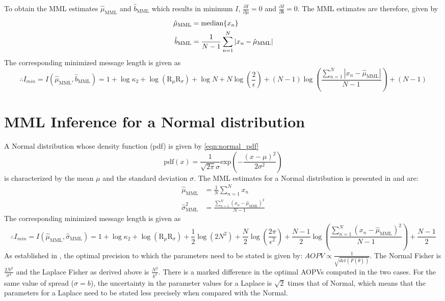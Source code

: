 \documentclass[wcp]{jmlr}
\begin{document}
\noindent To obtain the MML estimates $\hat{\mu}_{\mathrm{MML}}$ and $\hat{b}_{\mathrm{MML}}$ 
which results in minimum $I$, $\frac{\partial I}{\partial \mu} = 0$ and 
$\frac{\partial I}{\partial b} = 0$. The MML estimates are therefore, given by
\begin{align}
  \hat{\mu}_{\mathrm{MML}} &= \mathrm{median}\{x_n\} \notag\\
  \hat{b}_{\mathrm{MML}} &= \frac{1}{N-1} \sum_{n=1}^N |x_n-\hat{\mu}_{\mathrm{MML}}| 
  \label{eqn:laplace_estimate}
\end{align}
The corresponding minimized message length is given as
\begin{dmath}
 \therefore I_{min} = I(\hat{\mu}_{\mathrm{MML}},\hat{b}_{\mathrm{MML}}) = 1 + \log\kappa_2 + \log(\mathrm{R}_{\mu}\mathrm{R}_{\sigma}) + \log N + N\log\left(\frac{2}{\epsilon}\right) + (N-1) \log \left( \frac{\sum_{n=1}^N |x_n-\hat{\mu}_{\mathrm{MML}}|}{N-1} \right) + (N-1) \label{eqn:laplace_mml_estimate}
\end{dmath} 

\section{MML Inference for a Normal distribution}
A Normal distribution whose density function (pdf) is given by \eqref{eqn:normal_pdf}
\begin{equation}
\mathrm{pdf}(x) = \frac{1}{\sqrt{2\pi}\sigma} \mathrm{exp}\left(-\frac{(x-\mu)^2}{2\sigma^2}\right) \label{eqn:normal_pdf}
\end{equation}
is characterized by the mean $\mu$ and the standard deviation $\sigma$. The MML estimates 
for a Normal distribution is presented in \citet{WallaceBook,wallace-87} and are:
\begin{align*}
\hat{\mu}_{\mathrm{MML}} &= \frac{1}{N} \sum_{n=1}^N x_n \\
\hat{\sigma}_{\mathrm{MML}}^2 &= \frac{\sum_{n=1}^N (x_n-\hat{\mu}_{\mathrm{MML}})^2}{N-1}
\end{align*}
The corresponding minimized message length is given as
\begin{dmath}
 \therefore I_{min} = I(\hat{\mu}_{\mathrm{MML}},\hat{\sigma}_{\mathrm{MML}}) = 1 + \log\kappa_2 + \log(\mathrm{R}_{\mu}\mathrm{R}_{\sigma}) + \frac{1}{2}\log(2N^2) + \frac{N}{2}\log\left(\frac{2\pi}{\epsilon^2}\right) + \frac{N-1}{2}\log\left(\frac{\sum_{n=1}^N (x_n-\hat{\mu}_{\mathrm{MML}})^2}{N-1}\right) + \frac{N-1}{2}  \label{eqn:normal_mml_estimate}
\end{dmath} 
As established in \citet{wallace-87}, the optimal precision to which the parameters need
to be stated is given by: $AOPV \propto \frac{1}{\sqrt{det(F(\bar{\theta}))}}$.
The Normal Fisher is $\frac{2N^2}{\sigma^4}$ \citep{WallaceBook} and the Laplace Fisher 
as derived above is $\frac{N^2}{b^4}$. There is a marked difference in the optimal AOPVs
computed in the two cases. For the same value of spread ($\sigma=b$), the uncertainty in
the parameter values for a Laplace is $\sqrt{2}$ times that of Normal, which means
that the parameters for a Laplace need to be stated less precisely when compared with the Normal.
\end{document}
